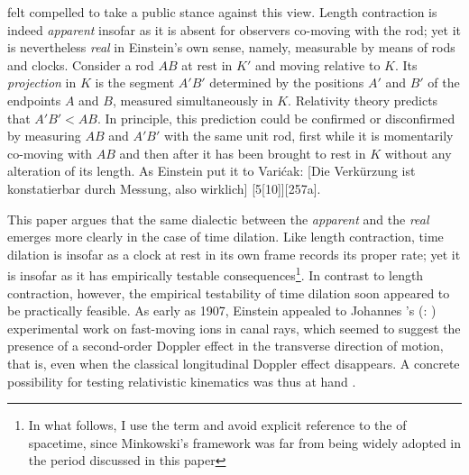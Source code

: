 \documentclass[pdflatex]{sn-jnl}
\newcommand{\tDe}{transverse Doppler effect\xspace}
\renewcommand{\citets}[2][]{\citeauthor{#2}'s (\citeyear{#2}\if\relax\detokenize{#1}\relax\else: #1\fi)}
\begin{document}
\citet{Einstein1911d} felt compelled to take a public stance against this view. Length contraction is indeed \emph{apparent} insofar as it is absent for observers co-moving with the rod; yet it is nevertheless \emph{real} in Einstein’s own sense, namely, measurable by means of rods and clocks. Consider a rod $AB$ at rest in $K'$ and moving relative to $K$. Its \emph{projection} in $K$ is the segment $A'B'$ determined by the positions $A'$ and $B'$ of the endpoints $A$ and $B$, measured simultaneously in $K$. Relativity theory predicts that $A'B'<AB$. In principle, this prediction could be confirmed or disconfirmed by measuring $AB$ and $A'B'$ with the same unit rod, first while it is momentarily co-moving with $AB$ and then after it has been brought to rest in $K$ without any alteration of its length. As Einstein put it to Varićak:  [Die Verkürzung ist konstatierbar durch Messung, also wirklich] [5{[}10{]}][257a]. 



This paper argues that the same dialectic between the \emph{apparent} and the \emph{real} emerges more clearly in the case of time dilation. Like length contraction, time dilation is  insofar as a clock at rest in its own frame records its proper rate; yet it is  insofar as it has empirically testable consequences\footnote{In what follows, I use the term  and avoid explicit reference to the  of spacetime, since Minkowski’s framework was far from being widely adopted in the period discussed in this paper}. In contrast to length contraction, however, the empirical testability of time dilation soon appeared to be practically feasible. As early as 1907, Einstein appealed to Johannes \citets{Stark1906} experimental work on fast-moving ions in canal rays, which seemed to suggest the presence of a second-order Doppler effect in the transverse direction of motion, that is, even when the classical longitudinal Doppler effect disappears. A concrete possibility for testing relativistic kinematics was thus at hand \citep{Giuliani2013}.

\end{document}

